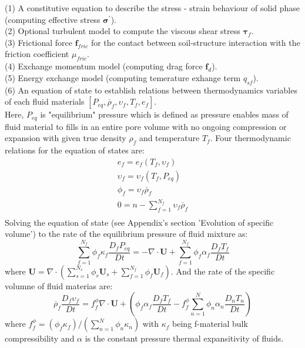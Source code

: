 \documentclass[preprint,12pt]{elsarticle}
\begin{document}
(1) A constitutive equation to describe the stress - strain behaviour of solid phase (computing effective stress $\pmb{\sigma}^\prime$). \\
(2) Optional turbulent model to compute the viscous shear stress $\pmb{\tau}_f$.\\
(3) Frictional force $\pmb{f}_{fric}$ for the contact between soil-structure interaction with the friction coefficient $\mu_{fric}$. \\
(4) Exchange momentum model (computing drag force $\pmb{f}_{d}$). \\
(5) Energy exchange model (computing temerature exhange term $q_{sf}$). \\
(6) An equation of state to establish relations between thermodynamics variables of each fluid materials $[P_{eq}, \overline{\rho}_f, \upsilon_f, T_f, e_f]$. \\
Here, $P_{eq}$ is "equilibrium" pressure which is defined as pressure enables mass of fluid material to fills in an entire pore volume with no ongoing compression or expansion with given true density $\rho_f$ and temperature $T_f$.  Four thermodynamic relations for the equation of states are:
%
%
\begin{equation}
\begin{gathered}
  e_f =  e_f (T_f, \upsilon_f)\\
 \upsilon_f =  \upsilon_f (T_f, P_{eq})\\
  \phi_f = \upsilon_f \overline{\rho}_f\\
  0 = n - \sum_{f=1}^{N_f} \upsilon_f \overline{\rho}_f\\
\end {gathered}
\end {equation}
%
%
Solving the equation of state (see Appendix's section 'Evolution of specific volume') to the rate of the equilibrium pressure of fluid mixture as:
%
%
\begin{equation}
\sum_{f=1}^{N_f} \phi_f \kappa_f \frac{D_f P_{eq}}{Dt} = - \nabla \cdot \pmb{U} + \sum_{f=1}^{N_f} \phi_f \alpha_f \frac{D_f T_f}{Dt}
\end {equation}
%
%
where $\pmb{U} = \nabla \cdot (\sum_{s=1}^{N_s} \phi_s \pmb{U}_s + \sum_{f=1}^{N_f}  \phi_f \pmb{U}_f)$.
And the rate of the specific volumne of fluid materias are:
%
%
\begin{equation}
\label{specific volume}
\overline{\rho}_f \frac{D_f \upsilon_f }{Dt} = f_f^{\phi} \nabla \cdot \pmb{U} + (\phi_f \alpha_f \frac{D_f T_f}{Dt} - f_f^{\phi} \sum_{n=1}^{N} \phi_n \alpha_n \frac{D_n T_n}{Dt})
\end {equation}
where $ f_f^{\phi} = (\phi_f  \kappa_f ) / (\sum_{n=1}^{N} \phi_n \kappa_n)$ with  $\kappa_f$ being f-material bulk compressibility and $\alpha$ is the constant pressure thermal expansitivity of fluids.
%
%
\end{document}
